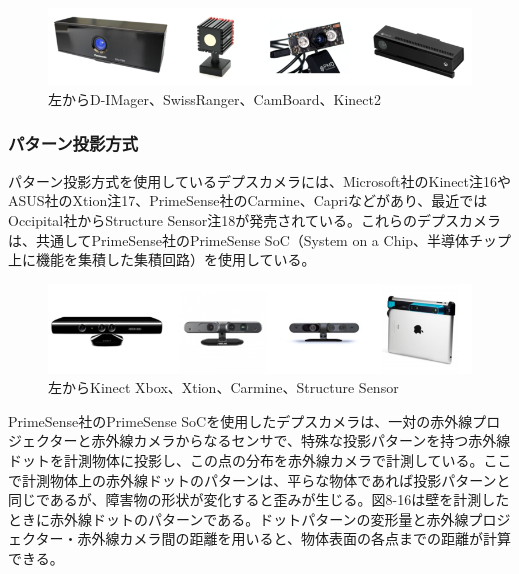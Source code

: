 \begin{figure}[ht]
  \centering
  \includegraphics[width=\columnwidth]{pictures/chapter8/pic_08_13.png}
  \caption{左からD-IMager、SwissRanger、CamBoard、Kinect2}
\end{figure}

\subsubsection{パターン投影方式}

パターン投影方式を使用しているデプスカメラには、Microsoft社のKinect注16やASUS社のXtion注17、PrimeSense社のCarmine、Capriなどがあり、最近ではOccipital社からStructure Sensor注18が発売されている。これらのデプスカメラは、共通してPrimeSense社のPrimeSense SoC（System on a Chip、半導体チップ上に機能を集積した集積回路）を使用している。

\begin{figure}[ht]
  \centering
  \includegraphics[width=\columnwidth]{pictures/chapter8/pic_08_14.png}
  \caption{左からKinect Xbox、Xtion、Carmine、Structure Sensor}
\end{figure}

PrimeSense社のPrimeSense SoCを使用したデプスカメラは、一対の赤外線プロジェクターと赤外線カメラからなるセンサで、特殊な投影パターンを持つ赤外線ドットを計測物体に投影し、この点の分布を赤外線カメラで計測している。ここで計測物体上の赤外線ドットのパターンは、平らな物体であれば投影パターンと同じであるが、障害物の形状が変化すると歪みが生じる。図8-16は壁を計測したときに赤外線ドットのパターンである。ドットパターンの変形量と赤外線プロジェクター・赤外線カメラ間の距離を用いると、物体表面の各点までの距離が計算できる。


